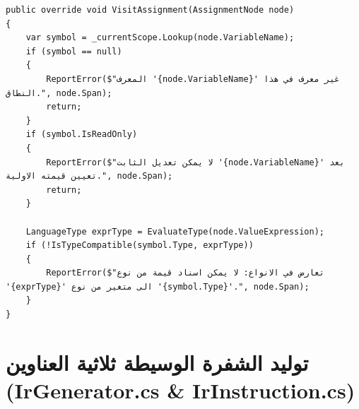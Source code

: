 \documentclass[12pt,a4paper]{report}
\begin{document}
\begin{lstlisting}[language={[Sharp]C}, caption={مقتطف حقيقي من التحقق الدلالي وفحص مجالات الرؤية DoctorSemanticAnalyzer.cs}]
public override void VisitAssignment(AssignmentNode node)
{
    var symbol = _currentScope.Lookup(node.VariableName);
    if (symbol == null)
    {
        ReportError($"المعرف '{node.VariableName}' غير معرف في هذا النطاق.", node.Span);
        return;
    }
    if (symbol.IsReadOnly)
    {
        ReportError($"لا يمكن تعديل الثابت '{node.VariableName}' بعد تعيين قيمته الاولية.", node.Span);
        return;
    }

    LanguageType exprType = EvaluateType(node.ValueExpression);
    if (!IsTypeCompatible(symbol.Type, exprType))
    {
        ReportError($"تعارض في الانواع: لا يمكن اسناد قيمة من نوع '{exprType}' الى متغير من نوع '{symbol.Type}'.", node.Span);
    }
}
\end{lstlisting}

\newpage

\section{توليد الشفرة الوسيطة ثلاثية العناوين (IrGenerator.cs \& IrInstruction.cs)}
\end{document}
